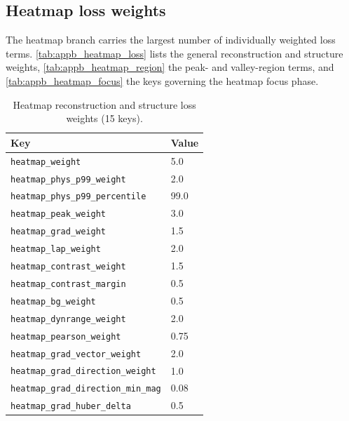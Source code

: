 \clearpage

\subsection{Heatmap loss weights}
\label{subsec:appb_heatmap_loss}

The heatmap branch carries the largest number of individually weighted loss terms.
\autoref{tab:appb_heatmap_loss} lists the general reconstruction and structure weights,
\autoref{tab:appb_heatmap_region} the peak- and valley-region terms, and
\autoref{tab:appb_heatmap_focus} the keys governing the heatmap focus phase.

\begin{table}[htbp]
\centering
\caption{Heatmap reconstruction and structure loss weights (15 keys).}
\label{tab:appb_heatmap_loss}
\begin{tabular}{@{}ll@{}}
\hline
Key & Value \\
\hline
\texttt{heatmap\_weight} & 5.0 \\
\texttt{heatmap\_phys\_p99\_weight} & 2.0 \\
\texttt{heatmap\_phys\_p99\_percentile} & 99.0 \\
\texttt{heatmap\_peak\_weight} & 3.0 \\
\texttt{heatmap\_grad\_weight} & 1.5 \\
\texttt{heatmap\_lap\_weight} & 2.0 \\
\texttt{heatmap\_contrast\_weight} & 1.5 \\
\texttt{heatmap\_contrast\_margin} & 0.5 \\
\texttt{heatmap\_bg\_weight} & 0.5 \\
\texttt{heatmap\_dynrange\_weight} & 2.0 \\
\texttt{heatmap\_pearson\_weight} & 0.75 \\
\texttt{heatmap\_grad\_vector\_weight} & 2.0 \\
\texttt{heatmap\_grad\_direction\_weight} & 1.0 \\
\texttt{heatmap\_grad\_direction\_min\_mag} & 0.08 \\
\texttt{heatmap\_grad\_huber\_delta} & 0.5 \\
\hline
\end{tabular}
\end{table}

